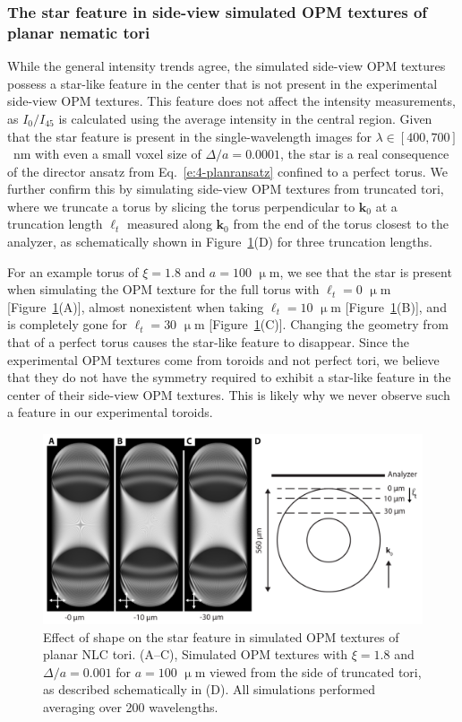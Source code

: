 \subsubsection{The star feature in side-view simulated OPM textures of planar nematic tori}
While the general intensity trends agree, the simulated side-view OPM textures possess a star-like feature in the center that is not present in the experimental side-view OPM textures.
This feature does not affect the intensity measurements, as $I_0/I_{45}$ is calculated using the average intensity in the central region.
Given that the star feature is present in the single-wavelength images for $\lambda \in [400,700]$~nm with even a small voxel size of $\Delta/a = 0.0001$, the star is a real consequence of the director ansatz from Eq.~\ref{e:4-planransatz} confined to a perfect torus.
We further confirm this by simulating side-view OPM textures from truncated tori, where we truncate a torus by slicing the torus perpendicular to $\mathbf{k}_0$ at a truncation length $\ell_t$ measured along $\mathbf{k}_0$ from the end of the torus closest to the analyzer, as schematically shown in Figure~\ref{f:4-nostar}(D) for three truncation lengths.

For an example torus of $\xi=1.8$ and $a = 100$ $\upmu$m, we see that the star is present when simulating the OPM texture for the full torus with $\ell_t=0$ $\upmu$m [Figure~\ref{f:4-nostar}(A)], almost nonexistent when taking $\ell_t=10$ $\upmu$m [Figure~\ref{f:4-nostar}(B)], and is completely gone for $\ell_t=30$ $\upmu$m [Figure~\ref{f:4-nostar}(C)].
Changing the geometry from that of a perfect torus causes the star-like feature to disappear.
Since the experimental OPM textures come from toroids and not perfect tori, we believe that they do not have the symmetry required to exhibit a star-like feature in the center of their side-view OPM textures.
This is likely why we never observe such a feature in our experimental toroids.
\begin{figure}
\centering
\includegraphics{figures/C4/Ch4-Figs_SimStarShape.png}
\caption{Effect of shape on the star feature in simulated OPM textures of planar NLC tori.
(A--C), Simulated OPM textures with $\xi = 1.8$ and $\Delta /a = 0.001$ for $a = 100$ $\upmu$m viewed from the side of truncated tori, as described schematically in (D).
All simulations performed averaging over 200 wavelengths.}\label{f:4-nostar}
\end{figure}


